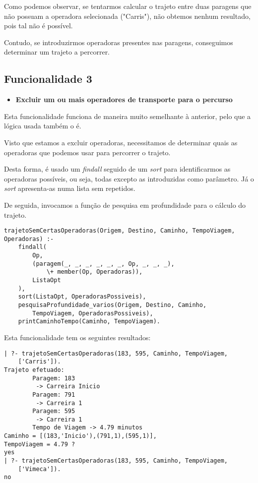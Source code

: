 \documentclass[a4paper,12pt]{report}
\begin{document}
\par Como podemos observar, se tentarmos calcular o trajeto entre duas paragens que não possuam a operadora selecionada ("Carris"), não obtemos nenhum resultado, pois tal não é possível.
\par Contudo, se introduzirmos operadoras presentes nas paragens, conseguimos determinar um trajeto a percorrer.

\vspace{1cm}

\subsection{Funcionalidade 3}
\begin{itemize}
    \item \textbf{Excluir um ou mais operadores de transporte para o percurso}
\end{itemize}

\par Esta funcionalidade funciona de maneira muito semelhante à anterior, pelo que a lógica usada também o é.
\par Visto que estamos a excluir operadoras, necessitamos de determinar quais as operadoras que podemos usar para percorrer o trajeto. 
\par Desta forma, é usado um \textit{findall} seguido de um \textit{sort} para identificarmos as operadoras possíveis, ou seja, todas excepto as introduzidas como parâmetro. Já o \textit{sort} apresenta-as numa lista sem repetidos. 
\par De seguida, invocamos a função de pesquisa em profundidade para o cálculo do trajeto.

\begin{verbatim}
trajetoSemCertasOperadoras(Origem, Destino, Caminho, TempoViagem,
Operadoras) :-
    findall(
        Op,
        (paragem(_, _, _, _, _, _, Op, _, _, _), 
            \+ member(Op, Operadoras)),
        ListaOpt
    ),
    sort(ListaOpt, OperadorasPossiveis),                               
    pesquisaProfundidade_varios(Origem, Destino, Caminho,
        TempoViagem, OperadorasPossiveis),
    printCaminhoTempo(Caminho, TempoViagem).
\end{verbatim}

\vspace{0.5cm}

\par Esta funcionalidade tem os seguintes resultados:

\begin{verbatim}
| ?- trajetoSemCertasOperadoras(183, 595, Caminho, TempoViagem,
    ['Carris']).
Trajeto efetuado: 
        Paragem: 183
         -> Carreira Inicio
        Paragem: 791
         -> Carreira 1
        Paragem: 595
         -> Carreira 1
        Tempo de Viagem -> 4.79 minutos
Caminho = [(183,'Inicio'),(791,1),(595,1)],
TempoViagem = 4.79 ? 
yes
| ?- trajetoSemCertasOperadoras(183, 595, Caminho, TempoViagem,
    ['Vimeca']).
no
\end{verbatim}
\end{document}
